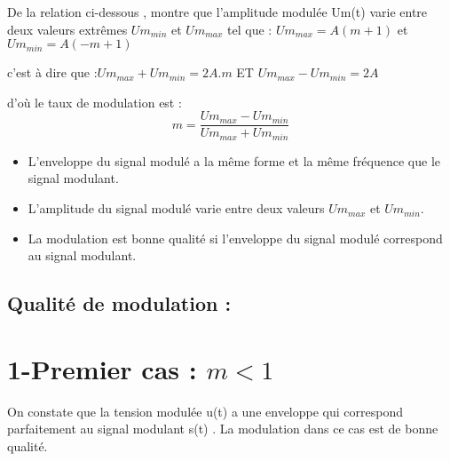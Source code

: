 \documentclass[12pt]{article}
\begin{document}
\begin{center}
\end{center}


De la relation ci-dessous , montre que l’amplitude modulée Um(t) varie
entre deux valeurs extrêmes $Um_{min}$ et $Um_{max}$
tel que :  $Um_{max} = A(m+1)$ et   $Um_{min} = A(-m+1)$

c’est à dire que :$Um_{max} + Um_{min} = 2A.m$  ET $Um_{max} - Um_{min} = 2A$

d’où le taux de modulation est :$$m = \frac{Um_{max } - Um_{min}}{Um_{max} + Um_{min}}$$

\begin{itemize}
	\item L'enveloppe du signal modulé a la même forme et la même fréquence que le signal modulant.
	\item L'amplitude du signal modulé varie entre deux valeurs $Um_{max}$ et $Um_{min}$.
	\item La modulation est bonne qualité si l'enveloppe du signal modulé correspond au signal modulant.
\end{itemize}

\subsection{Qualité de modulation : }

\section*{1-Premier cas : $m < 1$}
On constate que la tension modulée u(t) a une enveloppe qui correspond
parfaitement au signal modulant s(t) .
La modulation dans ce cas est de bonne qualité.
\end{document}

